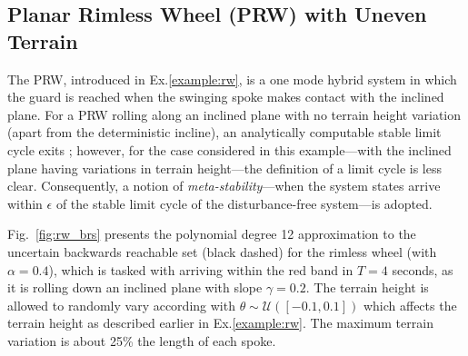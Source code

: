 \subsection{Planar Rimless Wheel (PRW) with Uneven Terrain}
The PRW, introduced in Ex.\ref{example:rw}, is a one mode hybrid system in which the guard is reached when the swinging spoke makes contact with the inclined plane.
For a PRW rolling along an inclined plane with no terrain height variation (apart from the deterministic incline), an analytically computable stable limit cycle exits \cite{Coleman1998}; however, for the case considered in this example---with the inclined plane having variations in terrain height---the definition of a limit cycle is less clear. 
Consequently, a notion of {\em meta-stability}---when the system states arrive within $\epsilon$ of the stable limit cycle of the disturbance-free system---is adopted.

Fig.~\ref{fig:rw_brs} presents the polynomial degree 12 approximation to the uncertain backwards reachable set (black dashed) for the rimless wheel (with $\alpha=0.4$), which is tasked with arriving within the red band in $T=4$ seconds, as it is rolling down an inclined plane with slope $\gamma=0.2$.
The terrain height is allowed to randomly vary according with $\theta\sim\mathcal U([-0.1,0.1])$ which affects the terrain height as described earlier in Ex.\ref{example:rw}. 
The maximum terrain variation is about 25\% the length of each spoke.

